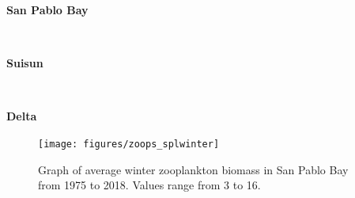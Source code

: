 \documentclass[
]{book}
\begin{document}
\begin{panel-grid}

\begin{columns-nocenter}

\begin{column800}

\textbf{San Pablo Bay}

\end{column800}

\begin{column40}

~

\end{column40}

\begin{column800}

\textbf{Suisun}

\end{column800}

\begin{column40}

~

\end{column40}

\begin{column800}

\textbf{Delta}

\end{column800}

\end{columns-nocenter}

\begin{columns-nocenter}

\begin{column800}

\begin{expand}

\begin{figure}
\texttt{[image: figures/zoops\_splwinter]} \caption{Graph of average winter zooplankton biomass in San Pablo Bay from 1975 to 2018. Values range from 3 to 16.}\label{fig:unnamed-chunk-165}
\end{figure}

\end{expand}

\end{column800}

\begin{column40}

~

\end{column40}


\end{columns-nocenter}
\end{panel-grid}
\end{document}
